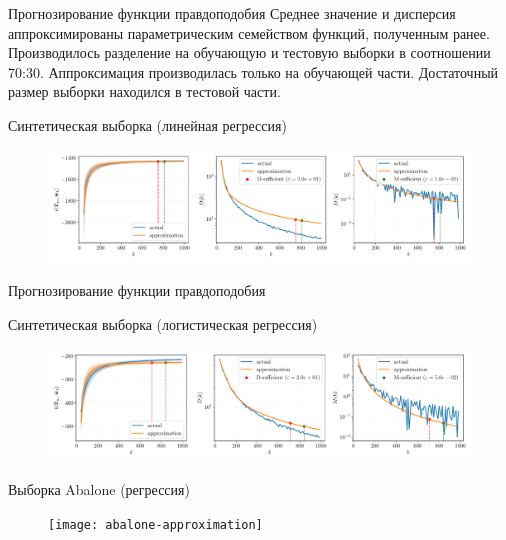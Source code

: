 \documentclass[10pt]{beamer}
\begin{document}
\begin{frame}{Прогнозирование функции правдоподобия}
    Среднее значение и дисперсия аппроксимированы параметрическим семейством функций, полученным ранее. Производилось разделение на обучающую и тестовую выборки в соотношении 70:30. Аппроксимация производилась только на обучающей части. Достаточный размер выборки находился в тестовой части.
    \vfill
    \begin{block}{Синтетическая выборка (линейная регрессия)}
        \begin{figure}[h!]
            \centering
            \includegraphics[width=\textwidth]{synthetic-regression-approximation}
        \end{figure}
    \end{block}
\end{frame}
\begin{frame}{Прогнозирование функции правдоподобия}
    \begin{block}{Синтетическая выборка (логистическая регрессия)}
        \begin{figure}[h!]
            \centering
            \includegraphics[width=\textwidth]{synthetic-classification-approximation}
        \end{figure}
    \end{block}
    \vfill
    \begin{block}{Выборка Abalone (регрессия)}
        \begin{figure}[h!]
            \centering
            \texttt{[image: abalone-approximation]}
        \end{figure}
    \end{block}
\end{frame}
\end{document}
